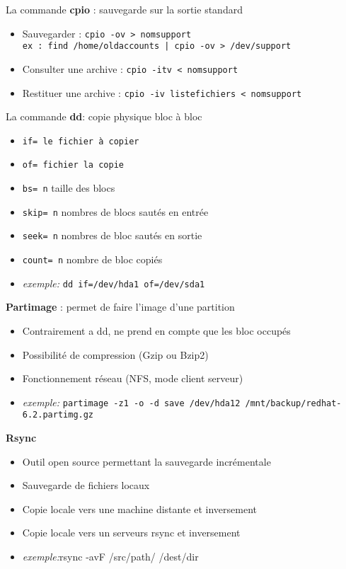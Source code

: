 \documentclass[french]{beamer}
\begin{document}
\begin{frame}
La commande \textbf{cpio} : sauvegarde sur la sortie standard
\begin{itemize}
\item   Sauvegarder : \texttt{cpio -ov > nomsupport}\\
\texttt{ex : find /home/oldaccounts | cpio -ov > /dev/support}
\item Consulter une archive : \texttt{cpio -itv < nomsupport}
\item Restituer une archive : \texttt{cpio -iv listefichiers < nomsupport}
\end{itemize}
\end{frame}

\begin{frame}
La commande \textbf{dd}: copie physique bloc à bloc
\begin{itemize}
\item \texttt{if= le fichier à copier}
\item \texttt{of= fichier la copie}
\item \texttt{bs= n}       taille des blocs
\item \texttt{skip= n}     nombres de blocs sautés en entrée
\item \texttt{seek= n}     nombres de bloc sautés en sortie
\item \texttt{count= n}    nombre de bloc copiés
\item \textit{exemple:} \texttt{dd if=/dev/hda1 of=/dev/sda1}
\end{itemize}
\end{frame}


\begin{frame}
\textbf{Partimage} : permet de faire l'image d'une partition
\begin{itemize}
\item Contrairement a dd, ne prend en compte que les bloc occupés
\item Possibilité de compression (Gzip ou Bzip2)
\item Fonctionnement réseau (NFS, mode client serveur)
\item \textit{exemple:} \texttt{partimage -z1 -o -d save /dev/hda12
/mnt/backup/redhat-6.2.partimg.gz}
\end{itemize}
\end{frame}

\begin{frame}
\textbf{Rsync}
\begin{itemize}
\item Outil open source permettant la sauvegarde incrémentale
\item Sauvegarde de fichiers locaux
\item Copie locale vers une machine distante et inversement
\item Copie locale vers un serveurs rsync et inversement
\item \textit{exemple:}{rsync -avF /src/path/ /dest/dir}
\end{itemize}
\end{frame}
\end{document}
